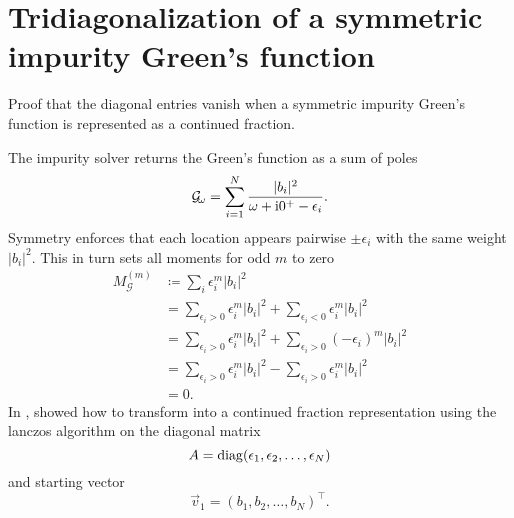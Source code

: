 \chapter{Tridiagonalization of a symmetric impurity Green's function}

Proof that the diagonal entries vanish when a symmetric impurity Green's function
is represented as a continued fraction.

The impurity solver returns the Green's function as a sum of poles
\begin{align}
    \mathcal{G}_{\!\omega} = \sum_{i=1}^N \frac{|b_i|^2}{\omega + \mathrm{i}0^+ - \epsilon_i}.
    \label{eq:impurity-greens-function}
\end{align}
Symmetry enforces that each location appears pairwise $\pm\epsilon_i$
with the same weight $|b_i|^2$.
This in turn sets all moments for odd $m$ to zero
\begin{align}
    M^{(m)}_{\mathcal{G}}
     & \coloneqq
    \sum_i \epsilon_i^m |b_i|^2                                                            \\
     & =
    \sum_{\epsilon_i>0} \epsilon_i^m |b_i|^2 + \sum_{\epsilon_i<0} \epsilon_i^m |b_i|^2    \\
     & =
    \sum_{\epsilon_i>0} \epsilon_i^m |b_i|^2 + \sum_{\epsilon_i>0} (-\epsilon_i)^m |b_i|^2 \\
     & =
    \sum_{\epsilon_i>0} \epsilon_i^m |b_i|^2 - \sum_{\epsilon_i>0} \epsilon_i^m |b_i|^2    \\
     & =
    0.
\end{align}
In \cite[appendix B]{Lu2014}, \citeauthor{Lu2014} showed how to transform
 into a continued fraction representation
using the lanczos algorithm on the diagonal matrix
\begin{equation}
    A
    =
    \operatorname{diag}(\epsilon_1, \epsilon_2, \ldots, \epsilon_N)
\end{equation}
and starting vector
\begin{equation}
    \vec{v}_1 = (b_1, b_2, \ldots, b_N)^\intercal.
\end{equation}

